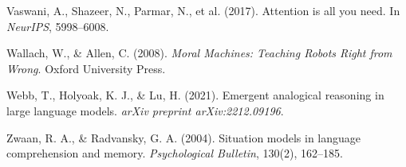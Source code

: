 \documentclass[12pt]{article}
\begin{document}
\begin{thebibliography}{99}
Vaswani, A., Shazeer, N., Parmar, N., et al. (2017).
\newblock Attention is all you need.
\newblock In \textit{NeurIPS}, 5998--6008.

Wallach, W., \& Allen, C. (2008).
\newblock \textit{Moral Machines: Teaching Robots Right from Wrong}.
\newblock Oxford University Press.

Webb, T., Holyoak, K. J., \& Lu, H. (2021).
\newblock Emergent analogical reasoning in large language models.
\newblock \textit{arXiv preprint arXiv:2212.09196}.

Zwaan, R. A., \& Radvansky, G. A. (2004).
\newblock Situation models in language comprehension and memory.
\newblock \textit{Psychological Bulletin}, 130(2), 162--185.

\end{thebibliography}
\end{document}
